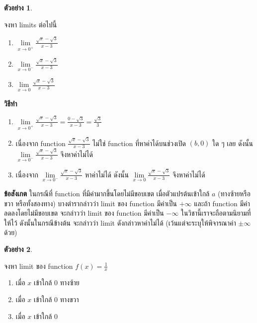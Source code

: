 \documentclass[
]{book}
\theoremstyle{definition}
\theoremstyle{definition}
\newtheorem{example}{ตัวอย่าง}[chapter]
\theoremstyle{definition}
\theoremstyle{definition}
\theoremstyle{remark}
\begin{document}
\begin{example}
\protect\hypertarget{exm:ex-limit-5}{}\label{exm:ex-limit-5}

จงหา limits ต่อไปนี้

\begin{enumerate}
\def\labelenumi{\arabic{enumi}.}
\item
  \(\underset{x\rightarrow 0^{+}}{\lim}\frac{\sqrt{x}-\sqrt{3}}{x-3}\)
\item
  \(\underset{x\rightarrow 0^{-}}{\lim}\frac{\sqrt{x}-\sqrt{3}}{x-3}\)
\item
  \(\underset{x\rightarrow 0}{\lim}\frac{\sqrt{x}-\sqrt{3}}{x-3}\)
\end{enumerate}

\end{example}

\textbf{วิธีทำ}

\begin{enumerate}
\def\labelenumi{\arabic{enumi}.}
\item
  \(\underset{x\rightarrow 0^{+}}{\lim}\frac{\sqrt{x}-\sqrt{3}}{x-3}\)\(=\frac{0-\sqrt{3}}{x-3}=\frac{\sqrt{3}}{3}\)
\item
  เนื่องจาก function \(\frac{\sqrt{x}-\sqrt{3}}{x-3}\) ไม่ใช่ function
  ที่หาค่าได้บนช่วงเปิด \(\left( b,0\right)\) ใด ๆ เลย ดังนั้น
  \(\underset{x\rightarrow 0^{-}}{\lim}\frac{\sqrt{x}-\sqrt{3}}{x-3}\)
  จึงหาค่าไม่ได้
\item
  เนื่องจาก
  \(\underset{x\rightarrow 0^{-}}{\lim}\frac{\sqrt{x}-\sqrt{3}}{x-3}\)
  หาค่าไม่ได้ ดังนั้น
  \(\underset{x\rightarrow 0}{\lim}\frac{\sqrt{x}-\sqrt{3}}{x-3}\)
  จึงหาค่าไม่ได้
\end{enumerate}

\textbf{ข้อสังเกต} ในกรณีที่ function ที่มีค่ามากขึ้นโดยไม่มีขอบเขต เมื่อตัวแปรต้นเข้าใกล้ \(a\)
(ทางซ้ายหรือขวา หรือทั้งสองทาง) บางตำรากล่าวว่า limit ของ function มีค่าเป็น
\(+\infty\) และถ้า function มีค่าลดลงโดยไม่มีขอบเขต จะกล่าวว่า limit ของ function
มีค่าเป็น \(-\infty\) ในวิชานี้เราจะถือตามนิยามที่ให้ไว้ ดังนั้นในกรณีข้างต้น จะกล่าวว่า limit
ดังกล่าวหาค่าไม่ได้ (เว้นแต่จะระบุให้พิจารณาค่า \(\pm \infty\) ด้วย)

\begin{example}
\protect\hypertarget{exm:ex-limit-6}{}\label{exm:ex-limit-6}

จงหา limit ของ function \(f\left( x\right) =\frac{1}{x}\)

\begin{enumerate}
\def\labelenumi{\arabic{enumi}.}
\item
  เมื่อ \(x\) เข้าใกล้ 0 ทางซ้าย
\item
  เมื่อ \(x\) เข้าใกล้ 0 ทางขวา
\item
  เมื่อ \(x\) เข้าใกล้ 0
\end{enumerate}

\end{example}
\end{document}
